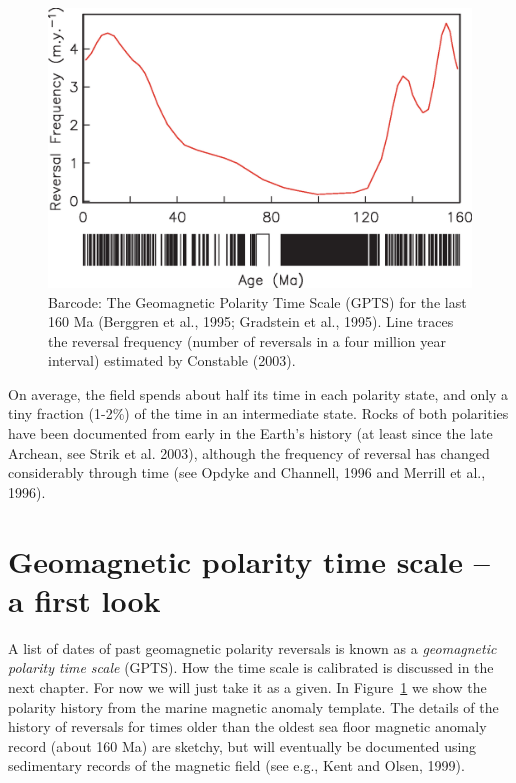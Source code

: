 \begin{figure}[htb]
\centering  \includegraphics[width=11 cm]{EPSfiles/gpts.eps}
\caption {Barcode: 
The Geomagnetic Polarity Time Scale (GPTS) for the last 160 Ma (Berggren et al., 1995; Gradstein et al., 1995).  Line traces the  reversal
frequency (number of reversals in a four million year interval) estimated by Constable (2003).}
\label{fig:longterm}
\end{figure}



 On average, the field spends about half its time in each polarity state,  
and only a tiny fraction (1-2\%) of the time in an intermediate state.
Rocks of both polarities have been documented from early in the Earth's 
history (at least since the late Archean, see Strik et al. 2003), although the frequency of reversal has changed
considerably through time (see
Opdyke and Channell, 1996    and Merrill et al., 1996).


\section{Geomagnetic polarity time scale -- a first look}

A list of  dates of past geomagnetic polarity reversals is known as a
 {\it geomagnetic polarity time scale} (GPTS).   How the time scale is calibrated is discussed in the next chapter.  For now we will just take it as a given.  In Figure~\ref{fig:longterm} we show the polarity history from the
marine magnetic anomaly template.
The details of the history of reversals for times older
than the oldest sea floor magnetic anomaly record (about 160 Ma)
are sketchy, but will eventually be
 documented using sedimentary records of the magnetic field (see e.g., 
Kent and Olsen, 1999).   


